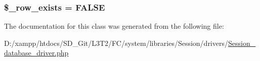 \subsubsection[{\$\+\_\+row\+\_\+exists}]{\setlength{\rightskip}{0pt plus 5cm}\$\+\_\+row\+\_\+exists = F\+A\+L\+S\+E\hspace{0.3cm}{\ttfamily [protected]}}\label{class_c_i___session__database__driver_a73dea3734ad53aa2affc8eb734db5525}


The documentation for this class was generated from the following file\+:\begin{DoxyCompactItemize}
\item 
D\+:/xampp/htdocs/\+S\+D\+\_\+\+Git/\+L3\+T2/\+F\+C/system/libraries/\+Session/drivers/\hyperlink{_session__database__driver_8php}{Session\+\_\+database\+\_\+driver.\+php}\end{DoxyCompactItemize}
